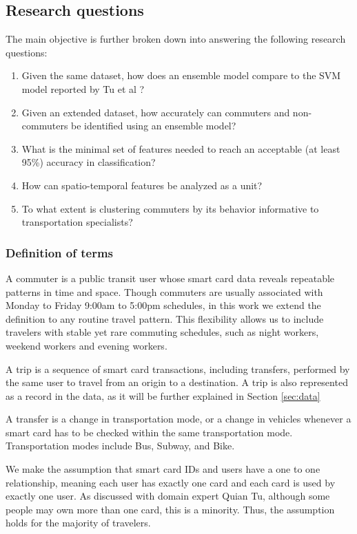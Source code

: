 \documentclass{article}
\begin{document}
\subsection{Research questions}
The main objective is further broken down into answering the following research questions: 

\begin{enumerate}
\item Given the same dataset, how does an ensemble model compare to the SVM model reported by Tu et al \cite{tu2016impact}?

\item Given an extended dataset, how accurately can commuters and non-commuters be identified using an ensemble model? 

\item What is the minimal set of features needed to reach an acceptable (at least 95\%) accuracy in classification?

\item How can spatio-temporal features be analyzed as a unit?

\item To what extent is clustering commuters by its behavior informative to transportation specialists? 

\end{enumerate}

\subsubsection{Definition of terms}
A commuter is a public transit user whose smart card data reveals repeatable patterns in time and space. Though commuters are usually associated with Monday to Friday 9:00am to 5:00pm schedules, in this work we extend the definition to any routine travel pattern. This flexibility allows us to include travelers with stable yet rare commuting schedules, such as night workers, weekend workers and evening workers.

A trip is a sequence of smart card transactions, including transfers, performed by the same user to travel from an origin to a destination. A trip is also represented as a record in the data, as it will be further explained in Section \ref{sec:data}

A transfer is a change in transportation mode, or a change in vehicles whenever a smart card has to be checked within the same transportation mode. Transportation modes include Bus, Subway, and Bike. 

We make the assumption that smart card IDs and users have a one to one relationship, meaning each user has exactly one card and each card is used by exactly one user. As discussed with domain expert Quian Tu, although some people may own more than one card, this is a minority. Thus, the assumption holds for the majority of travelers. 
\end{document}
